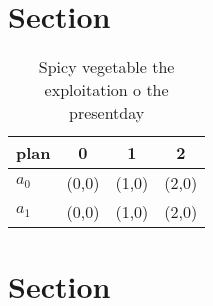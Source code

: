 \documentclass[a4paper]{article}
\begin{document}
\section{Section}

\begin{table}
\begin{adjustbox}{width=0.5\columnwidth}
\begin{tabular}{|l|l|l|l|}
\hline
\textbf{plan} & \multicolumn{1}{c|}{\textbf{0}} & \multicolumn{1}{c|}{\textbf{1}} & \multicolumn{1}{c|}{\textbf{2}} \\ \hline
\textbf{$a_0$}  & (0,0) & (1,0) & (2,0) \\ \hline
\textbf{$a_1$}  & (0,0) & (1,0) & (2,0) \\ \hline
\end{tabular}
\end{adjustbox}
\caption{Spicy vegetable the exploitation o the presentday
}
\end{table}

\section{Section}
\end{document}
